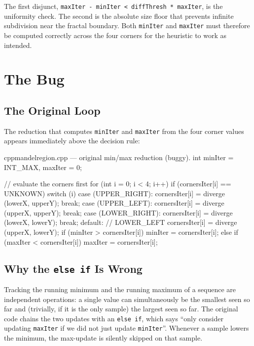 \documentclass[
	english,
	letterpaper, oneside
]{article}
\begin{document}
The first disjunct, \texttt{maxIter - minIter < diffThresh * maxIter},
is the uniformity check. The second is the absolute size floor that
prevents infinite subdivision near the fractal boundary. Both
\texttt{minIter} and \texttt{maxIter} must therefore be computed
correctly across the four corners for the heuristic to work as intended.

\section{The Bug}

\subsection{The Original Loop}

The reduction that computes \texttt{minIter} and \texttt{maxIter} from
the four corner values appears immediately above the decision rule:

\begin{sourcecode}{cpp}{mandelregion.cpp — original min/max reduction (buggy).}
int minIter = INT_MAX, maxIter = 0;

// evaluate the corners first
for (int i = 0; i < 4; i++)
  {
    if (cornersIter[i] == UNKNOWN)
      {
        switch (i)
          {
          case (UPPER_RIGHT):
            cornersIter[i] = diverge (lowerX, upperY);
            break;
          case (UPPER_LEFT):
            cornersIter[i] = diverge (upperX, upperY);
            break;
          case (LOWER_RIGHT):
            cornersIter[i] = diverge (lowerX, lowerY);
            break;
          default:           // LOWER_LEFT
            cornersIter[i] = diverge (upperX, lowerY);
          }
      }
    if (minIter > cornersIter[i])
      minIter = cornersIter[i];
    else if (maxIter < cornersIter[i])
      maxIter = cornersIter[i];
  }
\end{sourcecode}

\subsection{Why the \texttt{else if} Is Wrong}

Tracking the running minimum and the running maximum of a sequence are
independent operations: a single value can simultaneously be the
smallest seen so far and (trivially, if it is the only sample) the largest
seen so far. The original code chains the two updates with an
\texttt{else~if}, which says ``only consider updating \texttt{maxIter} if
we did not just update \texttt{minIter}''. Whenever a sample lowers the
minimum, the max-update is silently skipped on that sample.
\end{document}
